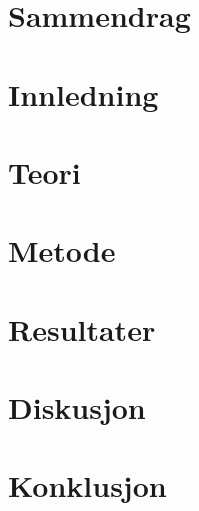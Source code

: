 \documentclass[12pt]{article}
\begin{document}
\makedoctitle

\setcounter{page}{1}

\tableofcontents

\clearpage
{}
\section*{Sammendrag}


\clearpage

\setcounter{page}{1}

\section{Innledning}


\clearpage

\section{Teori}


\clearpage

\section{Metode}


\clearpage

\section{Resultater}


\clearpage

\section{Diskusjon}


\clearpage

\section{Konklusjon}


\clearpage

\printbibliography

\clearpage
\end{document}
